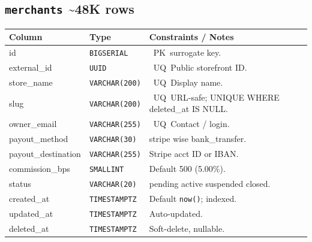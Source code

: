 \documentclass[8pt,a4paper]{extarticle}
\newcommand{\pkbadge}{\textcolor{primary}{\faKey}~PK}
\newcommand{\uqbadge}{\textcolor{accent}{\faPen}~UQ}
\newcommand{\tttype}[1]{\texttt{#1}}
\newcommand{\tableheader}[2]{\subsection{\texttt{#1} \textcolor{accent}{\textbar{} #2}}}
\begin{document}
\tableheader{merchants}{\textasciitilde{}48K rows}
\begin{tcolorbox}[schemaframe]
  \renewcommand{\arraystretch}{1.05}
  \begin{tabularx}{\linewidth}{p{2cm} p{1.6cm} X p{2cm}}
    \toprule
    \rowcolor{primary!10}\textbf{Column} & \textbf{Type} & \textbf{Constraints / Notes} \\
    \midrule
    id                 & \tttype{BIGSERIAL}   & \pkbadge\ surrogate key. \\
    external\_id       & \tttype{UUID}        & \uqbadge\ Public storefront ID. \\
    store\_name        & \tttype{VARCHAR(200)}& \uqbadge\ Display name. \\
    slug               & \tttype{VARCHAR(200)}& \uqbadge\ URL-safe; UNIQUE WHERE deleted\_at IS NULL. \\
    owner\_email       & \tttype{VARCHAR(255)}& \uqbadge\ Contact / login. \\
    payout\_method     & \tttype{VARCHAR(30)} & stripe \textbar{} wise \textbar{} bank\_transfer. \\
    payout\_destination& \tttype{VARCHAR(255)}& Stripe acct ID or IBAN. \\
    commission\_bps    & \tttype{SMALLINT}    & Default 500 (5.00\%). \\
    status             & \tttype{VARCHAR(20)} & pending \textbar{} active \textbar{} suspended \textbar{} closed. \\
    created\_at        & \tttype{TIMESTAMPTZ} & Default \texttt{now()}; indexed. \\
    updated\_at        & \tttype{TIMESTAMPTZ} & Auto-updated. \\
    deleted\_at        & \tttype{TIMESTAMPTZ} & Soft-delete, nullable. \\
    \bottomrule
  \end{tabularx}
\end{tcolorbox}
\end{document}
